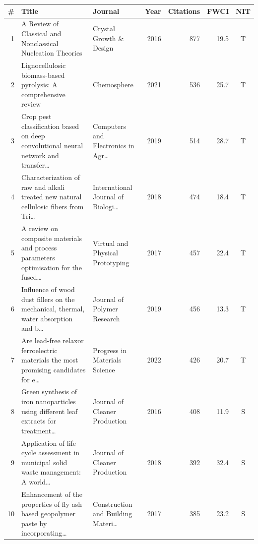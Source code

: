 \begin{tabular}{@{}rp{8.6cm}p{3.7cm}rrrc@{}}
\toprule
\# & Title & Journal & Year & Citations & FWCI & NIT \\
\midrule
1 & A Review of Classical and Nonclassical Nucleation Theories & Crystal Growth \& Design & 2016 & 877 & 19.5 & T \\
2 & Lignocellulosic biomass-based pyrolysis: A comprehensive review & Chemosphere & 2021 & 536 & 25.7 & T \\
3 & Crop pest classification based on deep convolutional neural network and transfer\ldots{} & Computers and Electronics in Agr\ldots{} & 2019 & 514 & 28.7 & T \\
4 & Characterization of raw and alkali treated new natural cellulosic fibers from Tri\ldots{} & International Journal of Biologi\ldots{} & 2018 & 474 & 18.4 & T \\
5 & A review on composite materials and process parameters optimisation for the fused\ldots{} & Virtual and Physical Prototyping & 2017 & 457 & 22.4 & T \\
6 & Influence of wood dust fillers on the mechanical, thermal, water absorption and b\ldots{} & Journal of Polymer Research & 2019 & 456 & 13.3 & T \\
7 & Are lead-free relaxor ferroelectric materials the most promising candidates for e\ldots{} & Progress in Materials Science & 2022 & 426 & 20.7 & T \\
8 & Green synthesis of iron nanoparticles using different leaf extracts for treatment\ldots{} & Journal of Cleaner Production & 2016 & 408 & 11.9 & S \\
9 & Application of life cycle assessment in municipal solid waste management: A world\ldots{} & Journal of Cleaner Production & 2018 & 392 & 32.4 & S \\
10 & Enhancement of the properties of fly ash based geopolymer paste by incorporating\ldots{} & Construction and Building Materi\ldots{} & 2017 & 385 & 23.2 & S \\
\bottomrule
\end{tabular}
